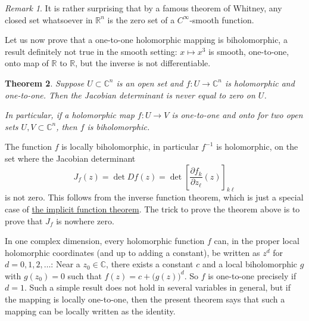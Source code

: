 \documentclass[12pt,openany]{book}
\newcommand{\C}{{\mathbb{C}}}
\newcommand{\R}{{\mathbb{R}}}
\theoremstyle{plain}
\newtheorem{thm}{Theorem}[section]
\theoremstyle{remark}
\newtheorem{remark}[thm]{Remark}
\theoremstyle{definition}
\theoremstyle{exercise}
\theoremstyle{example}
\begin{document}
\begin{remark}
It is rather surprising that by a famous theorem of Whitney,
any closed set whatsoever in $\R^n$
is the zero set of a $C^\infty$-smooth function.
\end{remark}

Let us now prove that a one-to-one holomorphic
mapping is biholomorphic, a result definitely not true in the
smooth setting: $x \mapsto x^3$ is smooth, one-to-one, onto map
of $\R$ to $\R$, but the inverse is not differentiable.

\begin{thm} \label{thm:injective}
Suppose $U \subset \C^n$ is an open set and $f \colon U \to \C^n$ is
holomorphic and one-to-one.
Then the Jacobian determinant is never equal to zero on $U$.

In particular, if a holomorphic map $f \colon U \to V$ is
one-to-one and onto for two open sets $U,V \subset \C^n$, then $f$ is
biholomorphic.
\end{thm}

The function $f$ is locally biholomorphic, in particular
$f^{-1}$ is holomorphic,
on the set where the Jacobian determinant
\begin{equation*}
J_f(z) = \det Df(z) = \det \left[ \frac{\partial f_k}{\partial z_\ell}(z)
\right]_{k\ell}
\end{equation*}
is not zero.  This follows from the inverse function theorem, which is just
a special case of \hyperref[thm:ift]{the implicit function theorem}.
The trick to prove the theorem above is to prove that $J_f$ is nowhere zero.

In one complex dimension, every holomorphic function $f$ can, in
the proper local holomorphic coordinates (and up to adding a constant),
be written as $z^d$ for $d=0,1,2,\ldots$:
Near a $z_0 \in \C$,
there exists a constant $c$ and a local biholomorphic $g$
with $g(z_0) = 0$ such that
$f(z) = c + {\bigl( g(z) \bigr)}^d$.
So $f$ is one-to-one precisely if $d=1$.
Such a simple result
does not hold in several variables in general, but if the mapping is
locally one-to-one, then the present theorem says that such a mapping can be
locally written as the identity.
\end{document}
